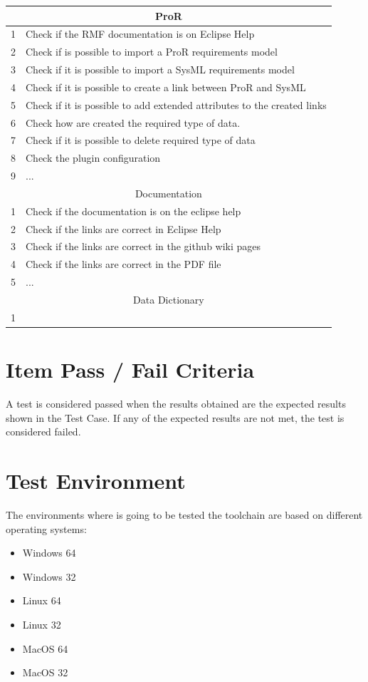 \begin{center}
\begin{longtable}{|p{2cm}|p{8cm}|}\hline
\multicolumn{2}{|c|}{ProR}\\\hline
1 & Check if the RMF documentation is on Eclipse Help\\\hline
2 & Check if is possible to import a ProR requirements model\\\hline
3 & Check if it is possible to import a SysML requirements model\\\hline
4 & Check if it is possible to create a link between ProR and SysML\\\hline
5 & Check if it is possible to add extended attributes to the created links\\\hline
6 & Check how are created the required type of data.\\\hline
7 & Check if it is possible to delete required type of data\\\hline
8 & Check the plugin configuration\\ \hline
9 & ... \\ \hline
\multicolumn{2}{|c|}{Documentation}\\\hline
1 & Check if the documentation is on the eclipse help\\\hline
2 & Check if the links are correct in Eclipse Help\\\hline
3 & Check if the links are correct in the github wiki pages\\\hline
4 & Check if the links are correct in the PDF file\\\hline
5 & ...\\ \hline
\multicolumn{2}{|c|}{Data Dictionary}\\\hline
1 & \\ \hline
\end{longtable}
\end{center}


\section{Item Pass / Fail Criteria}
A test is considered passed when the results obtained are the expected results shown in the Test Case. If any of the expected results are not met, the test is considered failed.

\section{Test Environment}
The environments where is going to be tested the toolchain are based on different operating systems:
\begin{itemize}
\item Windows 64
\item Windows 32
\item Linux 64
\item Linux 32
\item MacOS 64
\item MacOS 32
\end{itemize}

